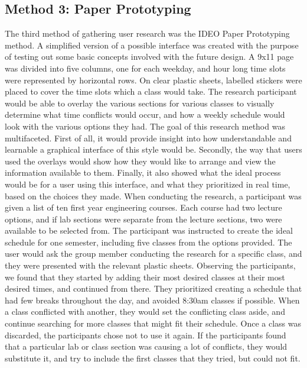 \documentclass{article}
\begin{document}
\subsection{Method 3: Paper Prototyping}
The third method of gathering user research was the IDEO Paper Prototyping method. A simplified version of a possible interface was created with the purpose of testing out some basic concepts involved with the future design. A 9x11 page was divided into five columns, one for each weekday, and hour long time slots were represented by horizontal rows. On clear plastic sheets, labelled stickers were placed to cover the time slots which a class would take. The research participant would be able to overlay the various sections for various classes to visually determine what time conflicts would occur, and how a weekly schedule would look with the various options they had. The goal of this research method was multifaceted. First of all, it would provide insight into how understandable and learnable a graphical interface of this style would be. Secondly, the way that users used the overlays would show how they would like to arrange and view the information available to them. Finally, it also showed what the ideal process would be for a user using this interface, and what they prioritized in real time, based on the choices they made. 
\newline
\newline
When conducting the research, a participant was given a list of ten first year engineering courses. Each course had two lecture options, and if lab sections were separate from the lecture sections, two were available to be selected from. The participant was instructed to create the ideal schedule for one semester, including five classes from the options provided. The user would ask the group member conducting the research for a specific class, and they were presented with the relevant plastic sheets. Observing the participants, we found that they started by adding their most desired classes at their most desired times, and continued from there. They prioritized creating a schedule that had few breaks throughout the day, and avoided 8:30am classes if possible. When a class conflicted with another, they would set the conflicting class aside, and continue searching for more classes that might fit their schedule. Once a class was discarded, the participants chose not to use it again. If the participants found that a particular lab or class section was causing a lot of conflicts, they would substitute it, and try to include the first classes that they tried, but could not fit.\newline 
\end{document}
